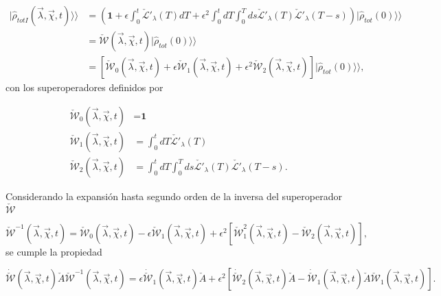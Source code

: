 \begin{appendixs}
\begin{align*}
    |\hat{\rho}_{totI}(\vec{\lambda},\vec{\chi},t)\rangle \rangle  & = \left( \textbf{1} + \epsilon \int_{0}^{t}\check{\mathcal{L}}'_{\lambda}(T)dT + \epsilon^{2}\int_{0}^{t}dT\int_{0}^{T}ds \check{\mathcal{L}}'_{\lambda}(T)\check{\mathcal{L}}'_{\lambda}(T-s) \right)|\hat{\rho}_{tot}(0)\rangle \rangle  \\
    & = \check{\mathcal{W}}(\vec{\lambda},\vec{\chi},t)|\hat{\rho}_{tot}(0)\rangle \rangle \\
    & =  [\check{\mathcal{W}}_{0}(\vec{\lambda},\vec{\chi},t) + \epsilon \check{\mathcal{W}}_{1}(\vec{\lambda},\vec{\chi},t) + \epsilon^{2}\check{\mathcal{W}}_{2}(\vec{\lambda},\vec{\chi},t)] |\hat{\rho}_{tot}(0)\rangle \rangle,
\end{align*}
con los superoperadores definidos por 

\begin{align*}
    \check{\mathcal{W}}_{0}(\vec{\lambda},\vec{\chi},t) &  = \textbf{1}\\
    \check{\mathcal{W}}_{1}(\vec{\lambda},\vec{\chi},t) & = \int_{0}^{t}dT \check{\mathcal{L}'}_{\lambda}(T) \\
    \check{\mathcal{W}}_{2}(\vec{\lambda},\vec{\chi},t) & = \int_{0}^{t}dT \int_{0}^{T}ds \check{\mathcal{L}'}_{\lambda}(T)\check{\mathcal{L}'}_{\lambda}(T-s).
\end{align*}

Considerando la expansión hasta segundo orden de la inversa del superoperador $\check{\mathcal{W}}$

\begin{equation}
    \check{\mathcal{W}}^{-1}(\vec{\lambda},\vec{\chi},t) =  \check{\mathcal{W}}_{0}(\vec{\lambda},\vec{\chi},t) - \epsilon  \check{\mathcal{W}}_{1}(\vec{\lambda},\vec{\chi},t) +  \epsilon^{2}[\check{\mathcal{W}}^{2}_{1}(\vec{\lambda},\vec{\chi},t) -  \check{\mathcal{W}}_{2}(\vec{\lambda},\vec{\chi},t) ],
\label{apendix2inverseW}
\end{equation}
se cumple la propiedad

\begin{equation}
    \dot{\check{\mathcal{W}}}(\vec{\lambda},\vec{\chi},t)\check{A}\check{\mathcal{W}}^{-1}(\vec{\lambda},\vec{\chi},t) = \epsilon \dot{\check{\mathcal{W}}}_{1}(\vec{\lambda},\vec{\chi},t)\check{A} + \epsilon^{2}[\dot{\check{\mathcal{W}}}_{2}(\vec{\lambda},\vec{\chi},t)\check{A} - \dot{\check{\mathcal{W}}}_{1}(\vec{\lambda},\vec{\chi},t)\check{A}\check{\mathcal{W}}_{1}(\vec{\lambda},\vec{\chi},t) ].
    \label{apendix2Wproperty}
\end{equation}


\end{appendixs}
